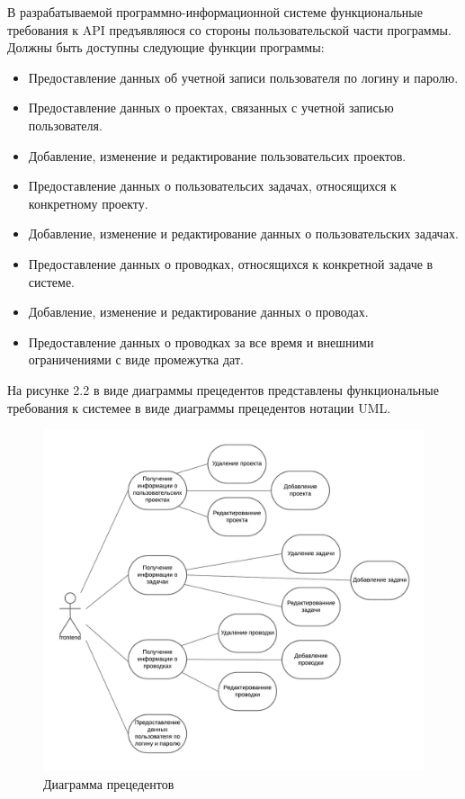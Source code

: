 В разрабатываемой программно-информационной системе функциональные требования к API предъявляюся со стороны пользовательской части программы.
Должны быть доступны следующие функции программы:

\begin{itemize}
\item Предоставление данных об учетной записи пользователя по логину и паролю.
\item Предоставление данных о проектах, связанных с учетной записью пользователя.
\item Добавление, изменение и редактирование пользовательсих проектов.
\item Предоставление данных о пользовательсих задачах, относящихся к конкретному проекту.
\item Добавление, изменение и редактирование данных о пользовательских задачах.
\item Предоставление данных о проводках, относящихся к конкретной задаче в системе.
\item Добавление, изменение и редактирование данных о проводах.
\item Предоставление данных о проводках за все время и внешними ограничениями с виде промежутка дат.  
\end{itemize}

На рисунке 2.2 в виде диаграммы прецедентов представлены функциональные требования к системее в виде диаграммы прецедентов нотации UML.

\begin{figure}[H]
	\centering
	\includegraphics[width=0.9\linewidth]{images/UMLPrecedent}
	\caption{Диаграмма прецедентов}
	\label{fig:umlprecedent}
\end{figure}

